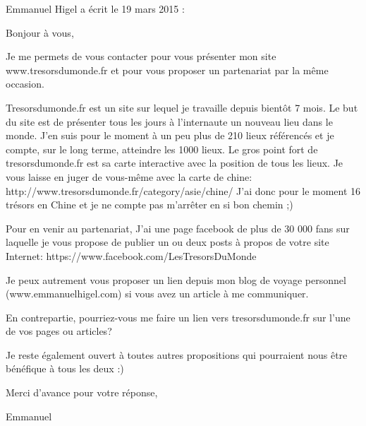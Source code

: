 \medskip
Emmanuel Higel a écrit le 19 mars 2015 :
\begin{displayquote}
Bonjour à vous,

Je me permets de vous contacter pour vous présenter mon site www.tresorsdumonde.fr et pour vous proposer un partenariat par la même occasion.

Tresorsdumonde.fr est un site sur lequel je travaille depuis bientôt 7 mois. Le but du site est de présenter tous les jours à l'internaute un nouveau lieu dans le monde.
J'en suis pour le moment à un peu plus de 210 lieux référencés et je compte, sur le long terme, atteindre les 1000 lieux.
Le gros point fort de tresorsdumonde.fr est sa carte interactive avec la position de tous les lieux. Je vous laisse en juger de vous-même avec la carte de chine:
http://www.tresorsdumonde.fr/category/asie/chine/
J'ai donc pour le moment 16 trésors en Chine et je ne compte pas m'arrêter en si bon chemin ;)

Pour en venir au partenariat, J'ai une page facebook de plus de 30 000 fans sur laquelle je vous propose de publier un ou deux posts à propos de votre site Internet:
https://www.facebook.com/LesTresorsDuMonde

Je peux autrement vous proposer un lien depuis mon blog de voyage personnel (www.emmanuelhigel.com) si vous avez un article à me communiquer.

En contrepartie, pourriez-vous me faire un lien vers tresorsdumonde.fr sur l'une de vos pages ou articles?

Je reste également ouvert à toutes autres propositions qui pourraient nous être bénéfique à tous les deux :)

Merci d'avance pour votre réponse,

Emmanuel
\end{displayquote}

\vfill
